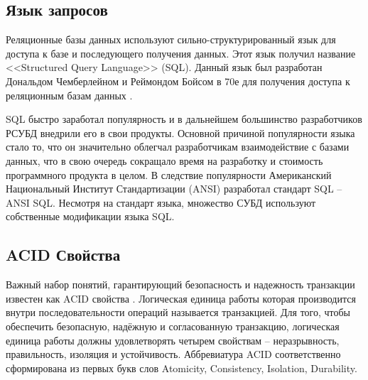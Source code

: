 \subsection{Язык запросов}
Реляционные базы данных используют сильно-структурированный язык для доступа к базе и последующего получения данных.
Этот язык получил название <<Structured Query Language>> (SQL).
Данный язык был разработан Дональдом Чемберлейном и Реймондом Бойсом в 70е для получения доступа к реляционным базам данных \cite{SQL}.

SQL быстро заработал популярность и в дальнейшем большинство разработчиков РСУБД внедрили его в свои продукты. 
Основной причиной популярности языка стало то, что он значительно облегчал разработчикам взаимодействие с базами данных,
что в свою очередь сокращало время на разработку и стоимость программного продукта в целом.
В следствие популярности Американский Национальный Институт Стандартизации (ANSI) разработал стандарт SQL -- ANSI SQL.
Несмотря на стандарт языка, множество СУБД используют собственные модификации языка SQL.


\subsection{ACID Свойства}
Важный набор понятий, гарантирующий безопасность и
надежность транзакции известен как ACID свойства \cite{Date}.
Логическая единица работы которая производится внутри последовательности операций
называется транзакцией. Для того, чтобы обеспечить безопасную, надёжную 
и согласованную транзакцию, логическая единица работы должны удовлетворять четырем свойствам 
-- неразрывность, правильность, изоляция и устойчивость. 
Аббревиатура ACID соответственно сформирована из первых букв слов 
Atomicity, Consistency, Isolation, Durability.

